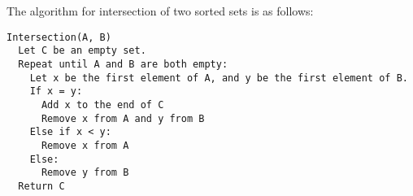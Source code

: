 The algorithm for intersection of two sorted sets is as follows:

\begin{verbatim}
Intersection(A, B)
  Let C be an empty set.
  Repeat until A and B are both empty:
    Let x be the first element of A, and y be the first element of B.
    If x = y:
      Add x to the end of C
      Remove x from A and y from B
    Else if x < y:
      Remove x from A
    Else:
      Remove y from B
  Return C
\end{verbatim}
